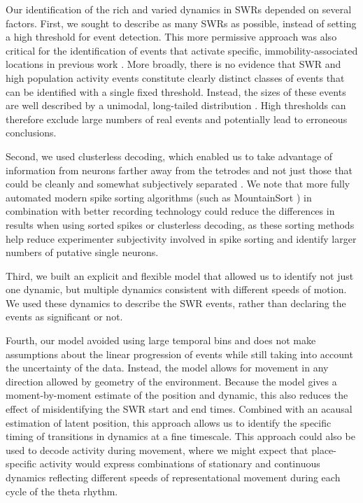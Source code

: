 \documentclass[9pt,lineno]{elife}
\begin{document}
Our identification of the rich and varied dynamics in SWRs depended on several factors. First, we sought to describe as many SWRs as possible, instead of setting a high threshold for event detection. This more permissive approach was also critical for the identification of events that activate specific, immobility-associated locations in previous work \citep{YuDistincthippocampalcorticalmemory2017}. More broadly, there is no evidence that SWR and high population activity events constitute clearly distinct classes of events that can be identified with a single fixed threshold. Instead, the sizes of these events are well described by a unimodal, long-tailed distribution \citep{YuDistincthippocampalcorticalmemory2017}. High thresholds can therefore exclude large numbers of real events and potentially lead to erroneous conclusions.

Second, we used clusterless decoding, which enabled us to take advantage of information from neurons farther away from the tetrodes and not just those that could be cleanly and somewhat subjectively separated \citep{ChenTransductiveneuraldecoding2012, KloostermanBayesiandecodingusing2014, DengRapidclassificationhippocampal2016}. We note that more fully automated modern spike sorting algorithms (such as MountainSort \citep{ChungFullyAutomatedApproach2017}) in combination with better recording technology could reduce the differences in results when using sorted spikes or clusterless decoding, as these sorting methods help reduce  experimenter subjectivity involved in spike sorting and identify larger numbers of putative single neurons.  

Third, we built an explicit and flexible model that allowed us to identify not just one dynamic, but multiple dynamics consistent with different speeds of motion. We used these dynamics to describe the SWR events, rather than declaring the events as significant or not.

Fourth, our model avoided using large temporal bins and does not make assumptions about the linear progression of events while still taking into account the uncertainty of the data. Instead, the model allows for movement in any direction allowed by geometry of the environment. Because the model gives a moment-by-moment estimate of the position and dynamic, this also reduces the effect of misidentifying the SWR start and end times. Combined with an acausal estimation of latent position, this approach allows us to identify the specific timing of transitions in dynamics at a fine timescale. This approach could also be used to decode activity during movement, where we might expect that place-specific activity would express combinations of stationary and continuous dynamics reflecting different speeds of representational movement during each cycle of the theta rhythm. 
\end{document}
